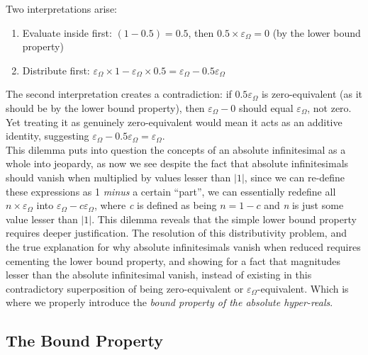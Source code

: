 \documentclass{article}
\begin{document}
Two interpretations arise:
\begin{enumerate}
\item Evaluate inside first: $(1 - 0.5) = 0.5$, then $0.5 \times \varepsilon_\Omega = 0$ (by the lower bound property)
\item Distribute first: $\varepsilon_\Omega \times 1 - \varepsilon_\Omega \times 0.5 = \varepsilon_\Omega - 0.5\varepsilon_\Omega$
\end{enumerate}
The second interpretation creates a contradiction: if $0.5\varepsilon_\Omega$ is zero-equivalent (as it should be by the lower bound property), then $\varepsilon_\Omega - 0$ should equal $\varepsilon_\Omega$, not zero. Yet treating it as genuinely zero-equivalent would mean it acts as an additive identity, suggesting $\varepsilon_\Omega - 0.5\varepsilon_\Omega = \varepsilon_\Omega$.\\This dilemma puts into question the concepts of an absolute infinitesimal as a whole into jeopardy, as now we see despite the fact that absolute infinitesimals should vanish when multiplied by values lesser than $|1|$, since we can re-define these expressions as 1 \textit{minus} a certain ``part'', we can essentially redefine all $n\times\varepsilon_\Omega$ into $\varepsilon_\Omega-c\varepsilon_\Omega$, where \textit{c} is defined as being $n=1-c$ and \textit{n} is just some value lesser than $|1|$. This dilemma reveals that the simple lower bound property requires deeper justification. The resolution of this distributivity problem, and the true explanation for why absolute infinitesimals vanish when reduced requires cementing the lower bound property, and showing for a fact that magnitudes lesser than the absolute infinitesimal vanish, instead of existing in this contradictory superposition of being zero-equivalent or $\varepsilon_\Omega$-equivalent. Which is where we properly introduce the \textit{bound property of the absolute hyper-reals}.

\subsection{The Bound Property}
\end{document}
